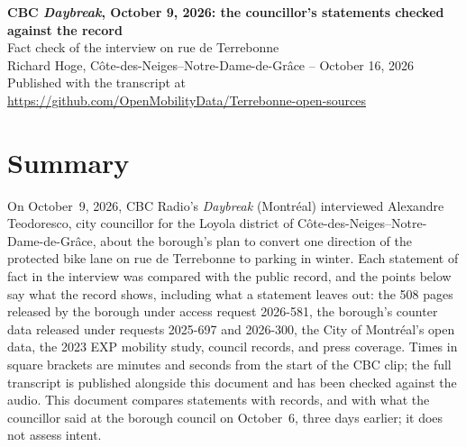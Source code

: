 \documentclass[11pt,letterpaper]{article}
\newcommand{\repourl}{https://github.com/OpenMobilityData/Terrebonne-open-sources}
\newcommand{\repo}[1]{\href{\repourl}{#1}}
\begin{document}
\begin{center}
{\Large\bfseries CBC \emph{Daybreak}, October 9, 2026: the councillor's statements checked against the record}\\[0.4em]
{\large Fact check of the interview on rue de Terrebonne}\\[0.6em]
Richard Hoge, Côte-des-Neiges--Notre-Dame-de-Grâce -- October 16, 2026\\
Published with the transcript at \repo{\repourl}
\end{center}

\section*{Summary}

On October~9, 2026, CBC Radio's \emph{Daybreak} (Montréal) interviewed
Alexandre Teodoresco, city councillor for the Loyola district of
Côte-des-Neiges--Notre-Dame-de-Grâce, about the borough's plan to convert
one direction of the protected bike lane on rue de Terrebonne to parking in
winter. Each statement of fact in the interview was compared with the
public record, and the points below say what the record shows, including
what a statement leaves out: the 508 pages released by the borough under access request
2026-581, the borough's counter data released under requests 2025-697 and
2026-300, the City of Montréal's open data, the 2023 EXP mobility study,
council records, and press coverage. Times in square brackets are minutes
and seconds from the start of the CBC clip; the full transcript is
published alongside this document and has been checked against the audio.
This document compares
statements with records, and with what the councillor said at the borough
council on October~6, three days earlier; it does not assess intent.
\end{document}
